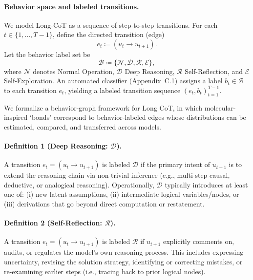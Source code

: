 \paragraph{Behavior space and labeled transitions.}
We model Long-CoT as a sequence of step-to-step transitions.
For each \(t \in \{1,\ldots,T-1\}\), define the directed transition (edge)
\begin{equation}
e_t \coloneqq (u_t \rightarrow u_{t+1}).
\end{equation}
Let the behavior label set be
\begin{equation}
\mathcal{B} \coloneqq \{\mathcal{N},\mathcal{D},\mathcal{R},\mathcal{E}\},
\end{equation}
where \(\mathcal{N}\) denotes Normal Operation, \(\mathcal{D}\) Deep Reasoning, \(\mathcal{R}\) Self-Reflection, and \(\mathcal{E}\) Self-Exploration.
An automated classifier (Appendix~C.1) assigns a label \(b_t \in \mathcal{B}\) to each transition \(e_t\), yielding a labeled transition sequence \((e_t,b_t)_{t=1}^{T-1}\).

We formalize a behavior-graph framework for Long CoT, in which molecular-inspired ‘bonds’ correspond to behavior-labeled edges whose distributions can be estimated, compared, and transferred across models.

\paragraph{Definition 1 (Deep Reasoning: \(\mathcal{D}\)).}
A transition \(e_t=(u_t \rightarrow u_{t+1})\) is labeled \(\mathcal{D}\) if the primary intent of \(u_{t+1}\) is to extend the reasoning chain via non-trivial inference (e.g., multi-step causal, deductive, or analogical reasoning).
Operationally, \(\mathcal{D}\) typically introduces at least one of: (i) new latent assumptions, (ii) intermediate logical variables/nodes, or (iii) derivations that go beyond direct computation or restatement.

\paragraph{Definition 2 (Self-Reflection: \(\mathcal{R}\)).}
A transition \(e_t=(u_t \rightarrow u_{t+1})\) is labeled \(\mathcal{R}\) if \(u_{t+1}\) explicitly comments on, audits, or regulates the model's own reasoning process.
This includes expressing uncertainty, revising the solution strategy, identifying or correcting mistakes, or re-examining earlier steps (i.e., tracing back to prior logical nodes).

